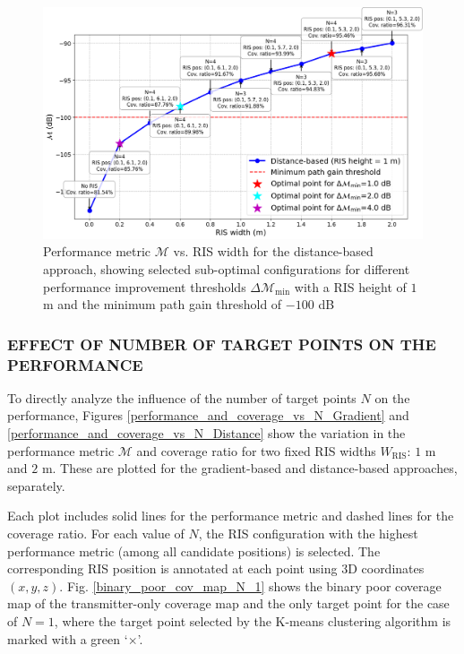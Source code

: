 \documentclass{IEEEoj}
\begin{document}
\begin{figure}
	\centering
	\includegraphics[width=\linewidth]{Sim_Results/perf_metric_RIS_width_-100dB_distance_height_1m.png}
	\caption{Performance metric $\mathcal{M}$ vs. RIS width for the distance-based approach, showing selected sub-optimal configurations for different performance improvement thresholds $\Delta \mathcal{M}_{\text{min}}$ with a RIS height of $1$ m and the minimum path gain threshold of $-100$ dB}
	\label{perf_metric_RIS_width_-100dB_distance_height_1m}
\end{figure}

\subsubsection{EFFECT OF NUMBER OF TARGET POINTS ON THE PERFORMANCE}
To directly analyze the influence of the number of target points $N$ on the performance, Figures \ref{performance_and_coverage_vs_N_Gradient} and \ref{performance_and_coverage_vs_N_Distance} show the variation in the performance metric $\mathcal{M}$ and coverage ratio for two fixed RIS widths $W_{\text{RIS}}$: $1$ m and $2$ m. These are plotted for the gradient-based and distance-based approaches, separately.

Each plot includes solid lines for the performance metric and dashed lines for the coverage ratio. For each value of $N$, the RIS configuration with the highest performance metric (among all candidate positions) is selected. The corresponding RIS position is annotated at each point using 3D coordinates $(x, y, z)$. Fig. \ref{binary_poor_cov_map_N_1} shows the binary poor coverage map of the transmitter-only coverage map and the only target point for the case of $N=1$, where the target point selected by the K-means clustering algorithm is marked with a green `$\times$'.
\end{document}
